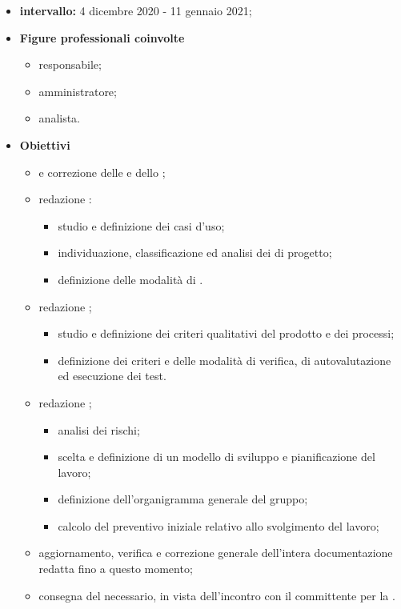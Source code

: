         
        \begin{itemize}
            \item \textbf{intervallo: }4 dicembre 2020 - 11 gennaio 2021;
            \item  \textbf{Figure professionali coinvolte}
                    \begin{itemize}
                        \item responsabile;
                        \item amministratore;
                        \item analista.
                    \end{itemize}
                    \item \textbf{Obiettivi}
                    \begin{itemize}
                        \item {} e correzione delle \NdP{} e dello \SdF{};
                        \item redazione \AdR{}:
                        \begin{itemize}
                            \item studio e definizione dei casi d'uso;
                            \item individuazione, classificazione ed analisi dei  di progetto;
                            \item definizione delle modalità di .
                        \end{itemize}
                        \item redazione \PdQ{};
                        \begin{itemize}
                            \item studio e definizione dei criteri qualitativi del prodotto e dei processi;
                            \item definizione dei criteri e delle modalità di verifica, di autovalutazione ed esecuzione dei test.
                        \end{itemize}
                        \item redazione \PdP{};
                        \begin{itemize}
                            \item analisi dei rischi;
                            \item scelta e definizione di un modello di sviluppo e pianificazione del lavoro;
                            \item definizione dell'organigramma generale del gruppo;
                            \item calcolo del preventivo iniziale relativo allo svolgimento del lavoro;
                        \end{itemize}
                        \item aggiornamento, verifica e correzione generale dell'intera documentazione redatta fino a questo momento;
                        \item consegna del  necessario, in vista dell'incontro con il committente per la \RR{}.
                    
                    \end{itemize}
        \end{itemize}